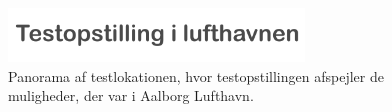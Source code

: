 \newpage   
%
\begin{figure}[H]
\centering
\includegraphics[width =0.7\textwidth, angle = -90]{Figure/TestdesignParametre/ParametreTestopstilling} 
\caption{Panorama af testlokationen, hvor testopstillingen afspejler de muligheder, der var i Aalborg Lufthavn. }
\label{fig:ParametreTestopstilling}
\end{figure}
\noindent
\blankline
%  

